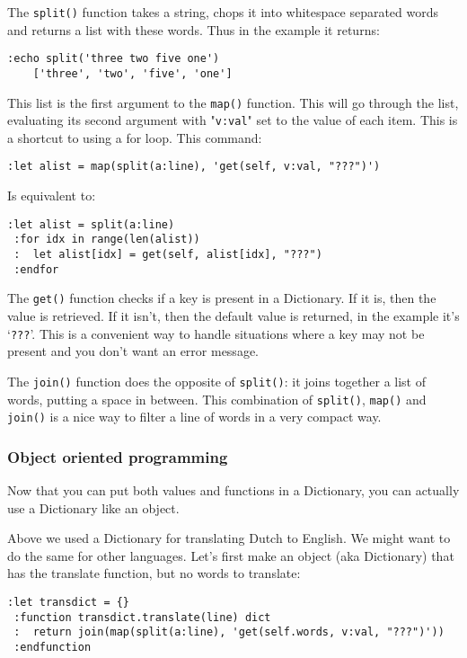 The \verb!split()! function takes a string, chops it into whitespace separated words and returns a list with these words.
Thus in the example it returns:

\begin{Verbatim}[samepage=true]
 :echo split('three two five one')
    ['three', 'two', 'five', 'one']
\end{Verbatim}

This list is the first argument to the \verb!map()! function.
This will go through the list, evaluating its second argument with "\verb!v:val!" set to the value of each item.
This is a shortcut to using a for loop.
This command:

\begin{Verbatim}[samepage=true]
 :let alist = map(split(a:line), 'get(self, v:val, "???")')
\end{Verbatim}

Is equivalent to:

\begin{Verbatim}[samepage=true]
 :let alist = split(a:line)
 :for idx in range(len(alist))
 :  let alist[idx] = get(self, alist[idx], "???")
 :endfor
\end{Verbatim}

The \verb!get()! function checks if a key is present in a Dictionary.
If it is, then the value is retrieved.
If it isn't, then the default value is returned, in the example it's `\verb!???!'.
This is a convenient way to handle situations where a key may not be present and you don't want an error message.

The \verb!join()! function does the opposite of \verb!split()!: it joins together a list of words, putting a space in between.
This combination of \verb!split()!, \verb!map()! and \verb!join()! is a nice way to filter a line of words in a very compact way.

\subsubsection{Object oriented programming}
Now that you can put both values and functions in a Dictionary, you can actually use a Dictionary like an object.

Above we used a Dictionary for translating Dutch to English.
We might want to do the same for other languages.
Let's first make an object (aka Dictionary) that has the translate function, but no words to translate:

\begin{Verbatim}[samepage=true]
 :let transdict = {}
 :function transdict.translate(line) dict
 :  return join(map(split(a:line), 'get(self.words, v:val, "???")'))
 :endfunction
\end{Verbatim}

